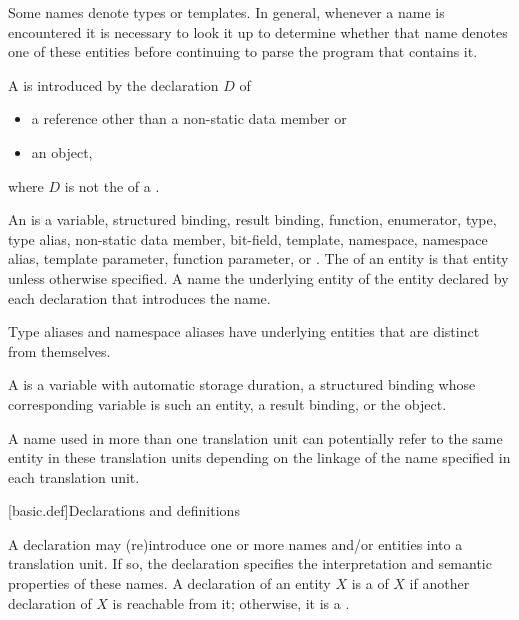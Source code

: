 \pnum
\begin{note}
Some names denote types or templates.
In general, whenever a name is encountered
it is necessary to look it up
to determine whether that name denotes one of these entities
before continuing to parse the program that contains it.
\end{note}

\pnum
A  is introduced by the
declaration $D$ of
\begin{itemize}
\item
a reference other than a non-static data member or
\item
an object,
\end{itemize}
where $D$ is not the  of
a .

\pnum
An  is a
variable,
structured binding,
result binding,
function,
enumerator,
type,
type alias,
non-static data member,
bit-field,
template,
namespace,
namespace alias,
template parameter,
function parameter, or
.
The  of an entity is that entity
unless otherwise specified.
A name  the underlying entity of
the entity declared by each declaration that introduces the name.
\begin{note}
Type aliases and namespace aliases have underlying entities
that are distinct from themselves.
\end{note}

\pnum
A  is a variable with
automatic storage duration,
a structured binding
whose corresponding variable is such an entity,
a result binding,
or the  object.

\pnum
{}%
%
A name used in more than one translation unit can potentially
refer to the same entity in these translation units depending on the
linkage of the name specified in each
translation unit.

[basic.def]{Declarations and definitions}

\pnum
{}%
%
%
A declaration may (re)introduce
one or more names and/or entities into a translation
unit.
If so, the
declaration specifies the interpretation and semantic properties of these names.
A declaration of an entity $X$ is
a  of $X$
if another declaration of $X$ is reachable from it;
otherwise, it is a .

